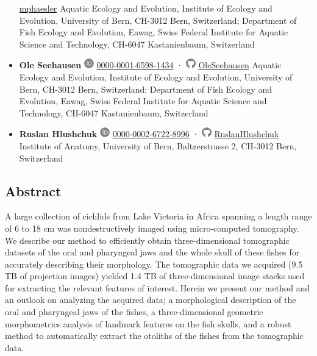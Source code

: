 \begin{itemize}
  \href{https://github.com/mphaesler}{mphaesler}
  Aquatic Ecology and Evolution, Institute of Ecology and Evolution, University of Bern, CH-3012 Bern, Switzerland; Department of Fish Ecology and Evolution, Eawag, Swiss Federal Institute for Aquatic Science and Technology, CH-6047 Kastanienbaum, Switzerland
\item
  \textbf{Ole Seehausen}
  \includegraphics[width=0.16667in,height=0.16667in]{images/orcid.svg}
  \href{https://orcid.org/0000-0001-6598-1434}{0000-0001-6598-1434} ·
  \includegraphics[width=0.16667in,height=0.16667in]{images/github.svg}
  \href{https://github.com/OleSeehausen}{OleSeehausen}
  Aquatic Ecology and Evolution, Institute of Ecology and Evolution, University of Bern, CH-3012 Bern, Switzerland; Department of Fish Ecology and Evolution, Eawag, Swiss Federal Institute for Aquatic Science and Technology, CH-6047 Kastanienbaum, Switzerland
\item
  \textbf{Ruslan Hlushchuk}
  \includegraphics[width=0.16667in,height=0.16667in]{images/orcid.svg}
  \href{https://orcid.org/0000-0002-6722-8996}{0000-0002-6722-8996} ·
  \includegraphics[width=0.16667in,height=0.16667in]{images/github.svg}
  \href{https://github.com/RuslanHlushchuk}{RuslanHlushchuk}
  Institute of Anatomy, University of Bern, Baltzerstrasse 2, CH-3012 Bern, Switzerland
\end{itemize}

\hypertarget{abstract}{%
\subsection{Abstract}\label{abstract}}

A large collection of cichlids from Lake Victoria in Africa spanning a length range of 6 to 18 cm was nondestructively imaged using micro-computed tomography.
We describe our method to efficiently obtain three-dimensional tomographic datasets of the oral and pharyngeal jaws and the whole skull of these fishes for accurately describing their morphology.
The tomographic data we acquired (9.5 TB of projection images) yielded 1.4 TB of three-dimensional image stacks used for extracting the relevant features of interest.
Herein we present our method and an outlook on analyzing the acquired data; a morphological description of the oral and pharyngeal jaws of the fishes, a three-dimensional geometric morphometrics analysis of landmark features on the fish skulls, and a robust method to automatically extract the otoliths of the fishes from the tomographic data.

